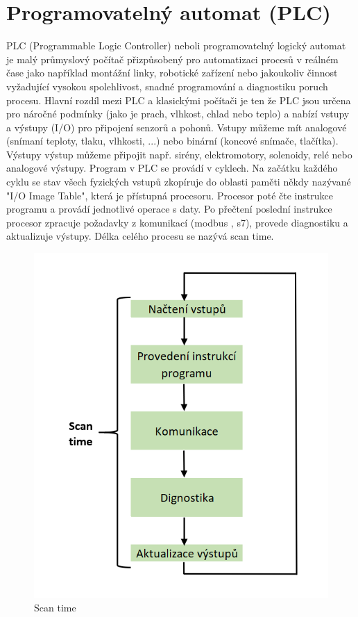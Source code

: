 \documentclass[a4paper,12pt,czech,bibliography=totoc]{scrbook}
\begin{document}
\section{Programovatelný automat (PLC)}
PLC (Programmable Logic Controller) neboli programovatelný logický automat je malý průmyslový počítač
přizpůsobený pro automatizaci procesů v reálném čase jako například montážní linky, robotické zařízení nebo
jakoukoliv činnost vyžadující vysokou spolehlivost, snadné programování a diagnostiku poruch procesu.
Hlavní rozdíl mezi PLC a klasickými počítači je ten že PLC jsou určena pro náročné podmínky (jako je prach,
vlhkost, chlad nebo teplo) a nabízí vstupy a výstupy (I/O) pro připojení senzorů a pohonů. Vstupy můžeme
mít analogové (snímaní teploty, tlaku, vlhkosti, ...) nebo binární (koncové snímače, tlačítka). Výstupy výstup
můžeme připojit např. sirény, elektromotory, solenoidy, relé nebo analogové výstupy.
\newline
\newline
 Program v PLC se provádí v cyklech. Na začátku každého cyklu se stav všech fyzických vstupů zkopíruje do oblasti paměti někdy nazývané "I/O Image Table", která je přístupná procesoru.  Procesor poté čte instrukce programu a provádí jednotlivé operace s daty. Po přečtení poslední instrukce procesor zpracuje požadavky z komunikací (modbus , s7), provede diagnostiku a aktualizuje výstupy. Délka celého procesu se nazývá scan time.
\cite{Berger2013}
\begin{figure}[h]
	\centering
	\includegraphics[scale = 0.6]{scanTime.PNG}
	\caption{Scan time}
	\label{fig:my_label}
\end{figure}
\end{document}
